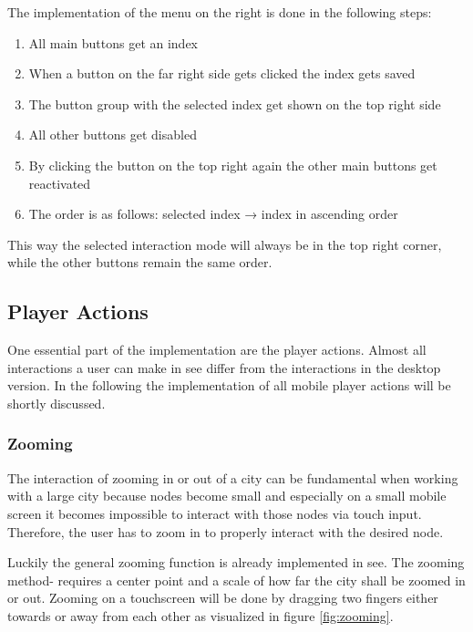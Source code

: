 The implementation of the menu on the right is done in the following steps:
\begin{enumerate}
    \item All main buttons get an index
    \item When a button on the far right side gets clicked the index gets saved
    \item The button group with the selected index get shown on the top right side
    \item All other buttons get disabled
    \item By clicking the button on the top right again the other main buttons get reactivated 
    \item The order is as follows: selected index → index in ascending order
\end{enumerate} 
This way the selected interaction mode will always be in the top right corner, while the other buttons remain the same order.

\subsection{Player Actions}
\label{sec:player_actions}

One essential part of the implementation are the player actions. 
Almost all interactions a user can make in \gls{see} differ from the interactions in the desktop version.
In the following the implementation of all mobile player actions will be shortly discussed.

\subsubsection{Zooming}

The interaction of zooming in or out of a \gls{city} can be fundamental when working with a large \gls{city} because \glspl{node} become small and especially on a small mobile screen it becomes impossible to interact with those nodes via touch input. 
Therefore, the user has to zoom in to properly interact with the desired node.

Luckily the general zooming function is already implemented in \gls{see}.
The zooming method- requires a center point and a scale of how far the \gls{city} shall be zoomed in or out.
Zooming on a touchscreen will be done by dragging two fingers either towards or away from each other as visualized in figure \ref{fig:zooming}.

